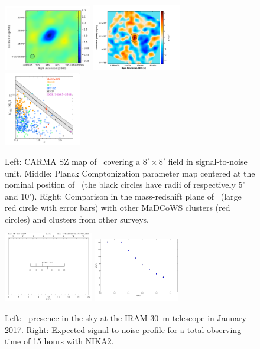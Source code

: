 \documentclass[11pt,a4paper,twoside,graphicx,color]{article}
\begin{document}
\begin{figure}[h]
\centering	
\includegraphics[width=0.34\textwidth]{./cluster.pdf}   
\hspace{0.13cm}
\includegraphics[width=0.35\textwidth]{.//MOO_Planck_3.pdf}
\hspace{-0.5cm}  
 \includegraphics[width=0.3\textwidth]{./redshift_mass.pdf}   
\caption{\footnotesize Left: CARMA SZ map of \moo\ covering a $8' \times 8'$ field in signal-to-noise unit. Middle: Planck Comptonization parameter map centered at the nominal position of \moo\  (the black circles have radii of respectively 5' and 10'). Right: Comparison in the mass-redshift plane of \moo\ (large red circle with error bars) with other MaDCoWS clusters (red circles) and clusters from other surveys.}
\label{fig:SZ_MOO}
\end{figure}

\begin{figure}[h!]
\centering	
\includegraphics[width=0.35\textwidth]{./sky_trajectory.png}
\hspace{1.5cm}
\includegraphics[width=0.33\textwidth]{./MOOJ1142_snr_prof.pdf}  
\caption{\footnotesize Left: \moo\ presence in the sky at the IRAM 30~m telescope in January 2017. Right: Expected signal-to-noise profile for a total observing time of 15 hours with NIKA2.}
\label{fig:technical}
\end{figure}
\end{document}

